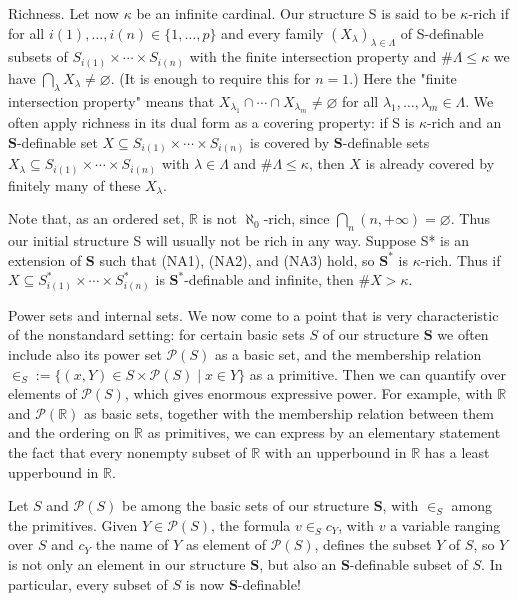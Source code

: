 \documentclass[10pt]{article}
\begin{document}
Richness. Let now $\kappa$ be an infinite cardinal. Our structure S is said to be $\kappa$-rich if for all $i(1), \ldots, i(n) \in\{1, \ldots, p\}$ and every family $\left(X_{\lambda}\right)_{\lambda \in \Lambda}$ of S-definable subsets of $S_{i(1)} \times \cdots \times S_{i(n)}$ with the finite intersection property and $\# \Lambda \leq \kappa$ we have $\bigcap_{\lambda} X_{\lambda} \neq \varnothing$. (It is enough to require this for $n=1$.) Here the "finite intersection property" means that $X_{\lambda_{1}} \cap \cdots \cap X_{\lambda_{m}} \neq \varnothing$ for all $\lambda_{1}, \ldots, \lambda_{m} \in \Lambda$. We often apply richness in its dual form as a covering property: if S is $\kappa$-rich and an $\mathbf{S}$-definable set $X \subseteq S_{i(1)} \times \cdots \times S_{i(n)}$ is covered by $\mathbf{S}$-definable sets $X_{\lambda} \subseteq S_{i(1)} \times \cdots \times S_{i(n)}$ with $\lambda \in \Lambda$ and $\# \Lambda \leq \kappa$, then $X$ is already covered by finitely many of these $X_{\lambda}$.

Note that, as an ordered set, $\mathbb{R}$ is not $\aleph_{0}$-rich, since $\bigcap_{n}(n,+\infty)=\varnothing$. Thus our initial structure S will usually not be rich in any way. Suppose S* is an extension of $\mathbf{S}$ such that (NA1), (NA2), and (NA3) hold, so $\mathbf{S}^{*}$ is $\kappa$-rich. Thus if $X \subseteq S_{i(1)}^{*} \times \cdots \times S_{i(n)}^{*}$ is $\mathbf{S}^{*}$-definable and infinite, then $\# X>\kappa$.

Power sets and internal sets. We now come to a point that is very characteristic of the nonstandard setting: for certain basic sets $S$ of our structure $\mathbf{S}$ we often include also its power set $\mathcal{P}(S)$ as a basic set, and the membership relation $\in_{S}:=\{(x, Y) \in S \times \mathcal{P}(S) \mid x \in Y\}$ as a primitive. Then we can quantify over elements of $\mathcal{P}(S)$, which gives enormous expressive power. For example, with $\mathbb{R}$ and $\mathcal{P}(\mathbb{R})$ as basic sets, together with the membership relation between them and the ordering on $\mathbb{R}$ as primitives, we can express by an elementary statement the fact that every nonempty subset of $\mathbb{R}$ with an upperbound in $\mathbb{R}$ has a least upperbound in $\mathbb{R}$.

Let $S$ and $\mathcal{P}(S)$ be among the basic sets of our structure $\mathbf{S}$, with $\in_{S}$ among the primitives. Given $Y \in \mathcal{P}(S)$, the formula $v \in_{S} c_{Y}$, with $v$ a variable ranging over $S$ and $c_{Y}$ the name of $Y$ as element of $\mathcal{P}(S)$, defines the subset $Y$ of $S$, so $Y$ is not only an element in our structure $\mathbf{S}$, but also an $\mathbf{S}$-definable subset of $S$. In particular, every subset of $S$ is now $\mathbf{S}$-definable!
\end{document}
